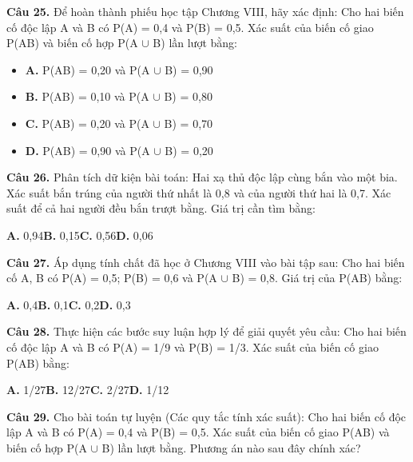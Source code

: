 \documentclass[11pt,a4paper]{article}
\begin{document}
\textbf{\color{primary} Câu 25.} Để hoàn thành phiếu học tập Chương VIII, hãy xác định: Cho hai biến cố độc lập A và B có P(A) = 0,4 và P(B) = 0,5. Xác suất của biến cố giao P(AB) và biến cố hợp P(A $\cup$ B) lần lượt bằng:\par
\begin{itemize}\setlength{\itemsep}{1pt}\setlength{\parskip}{0pt}
  \item[] \textbf{A.} P(AB) = 0,20 và P(A $\cup$ B) = 0,90
  \item[] \textbf{B.} P(AB) = 0,10 và P(A $\cup$ B) = 0,80
  \item[] \textbf{C.} P(AB) = 0,20 và P(A $\cup$ B) = 0,70
  \item[] \textbf{D.} P(AB) = 0,90 và P(A $\cup$ B) = 0,20
\end{itemize}\vspace{2pt}
\textbf{\color{primary} Câu 26.} Phân tích dữ kiện bài toán: Hai xạ thủ độc lập cùng bắn vào một bia. Xác suất bắn trúng của người thứ nhất là 0,8 và của người thứ hai là 0,7. Xác suất để cả hai người đều bắn trượt bằng. Giá trị cần tìm bằng:\par
\hspace*{1.5em}\textbf{A.} 0,94\quad\quad \textbf{B.} 0,15\quad\quad \textbf{C.} 0,56\quad\quad \textbf{D.} 0,06\par\vspace{2pt}
\textbf{\color{primary} Câu 27.} Áp dụng tính chất đã học ở Chương VIII vào bài tập sau: Cho hai biến cố A, B có P(A) = 0,5; P(B) = 0,6 và P(A $\cup$ B) = 0,8. Giá trị của P(AB) bằng:\par
\hspace*{1.5em}\textbf{A.} 0,4\quad\quad \textbf{B.} 0,1\quad\quad \textbf{C.} 0,2\quad\quad \textbf{D.} 0,3\par\vspace{2pt}
\textbf{\color{primary} Câu 28.} Thực hiện các bước suy luận hợp lý để giải quyết yêu cầu: Cho hai biến cố độc lập A và B có P(A) = 1/9 và P(B) = 1/3. Xác suất của biến cố giao P(AB) bằng:\par
\hspace*{1.5em}\textbf{A.} 1/27\quad\quad \textbf{B.} 12/27\quad\quad \textbf{C.} 2/27\quad\quad \textbf{D.} 1/12\par\vspace{2pt}
\textbf{\color{primary} Câu 29.} Cho bài toán tự luyện (Các quy tắc tính xác suất): Cho hai biến cố độc lập A và B có P(A) = 0,4 và P(B) = 0,5. Xác suất của biến cố giao P(AB) và biến cố hợp P(A $\cup$ B) lần lượt bằng. Phương án nào sau đây chính xác?\par
\end{document}
